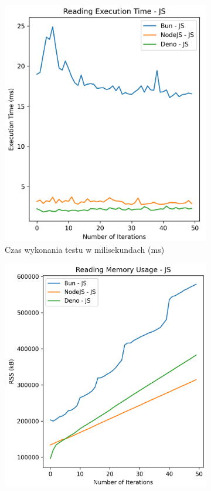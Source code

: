 \begin{figure}[H]
  \centering
  \begin{subfigure}[b]{0.44\textwidth}
    \centering
    \includegraphics[width=\textwidth]{Figures/files/files_writing_50_500_50_js_time.png}
    \caption{Czas wykonania testu w milisekundach (ms)}
    \label{fig:file_e1_writing_js_time}
  \end{subfigure}
  \begin{subfigure}[b]{0.44\textwidth}
    \centering
    \includegraphics[width=\textwidth]{Figures/files/files_writing_50_500_50_js_memory.png}

\end{subfigure}
\end{figure}
